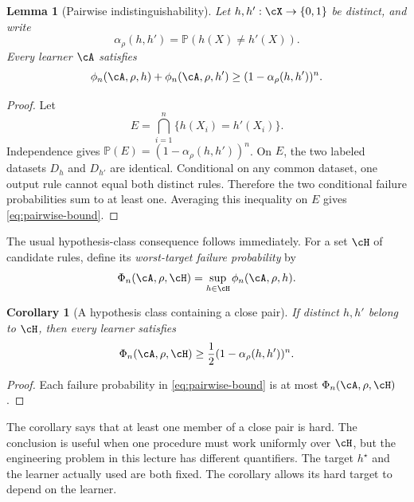 \documentclass[11pt,twoside]{article}
\renewcommand{\P}{\mathbb P}
\newtheorem{lemma}[theorem]{Lemma}
\newtheorem{corollary}[theorem]{Corollary}
\theoremstyle{definition}
\theoremstyle{remark}
\begin{document}
\begin{lemma}[Pairwise indistinguishability]
\label{lem:pairwise}
Let \(h,h':\cX\to\{0,1\}\) be distinct, and write
\begin{equation}
 \alpha_\rho(h,h')=\P(h(X)\ne h'(X)).
 \label{eq:pair-disagreement}
\end{equation}
Every learner \(\cA\) satisfies
\begin{equation}
 \phi_n(\cA,\rho,h)+\phi_n(\cA,\rho,h')
 \ge (1-\alpha_\rho(h,h'))^n.
 \label{eq:pairwise-bound}
\end{equation}
\end{lemma}
\begin{proof}
Let
\[
 E=\bigcap_{i=1}^n\{h(X_i)=h'(X_i)\}.
\]
Independence gives \(\P(E)=(1-\alpha_\rho(h,h'))^n\). On \(E\), the two
labeled datasets \(D_h\) and \(D_{h'}\) are identical. Conditional on any
common dataset, one output rule cannot equal both distinct rules. Therefore
the two conditional failure probabilities sum to at least one. Averaging this
inequality on \(E\) gives \cref{eq:pairwise-bound}.
\end{proof}

The usual hypothesis-class consequence follows immediately. For a set
\(\cH\) of candidate rules, define its \emph{worst-target failure probability}
by
\begin{equation}
 \Phi_n(\cA,\rho,\cH)
 =\sup_{h\in\cH}\phi_n(\cA,\rho,h).
 \label{eq:class-failure}
\end{equation}

\begin{corollary}[A hypothesis class containing a close pair]
\label{cor:class-pair}
If distinct \(h,h'\) belong to \(\cH\), then every learner satisfies
\begin{equation}
 \Phi_n(\cA,\rho,\cH)
 \ge\frac12(1-\alpha_\rho(h,h'))^n.
 \label{eq:class-pair-bound}
\end{equation}
\end{corollary}
\begin{proof}
Each failure probability in \cref{eq:pairwise-bound} is at most
\(\Phi_n(\cA,\rho,\cH)\).
\end{proof}

The corollary says that at least one member of a close pair is hard. The
conclusion is useful when one procedure must work uniformly over \(\cH\), but
the engineering problem in this lecture has different quantifiers. The target
\(h^\star\) and the learner actually used are both fixed. The corollary allows
its hard target to depend on the learner.
\end{document}

